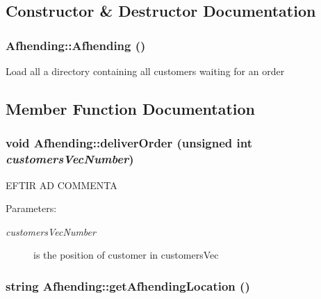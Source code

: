\subsection{Constructor \& Destructor Documentation}
\hypertarget{class_afhending_9365433a6f973ad929ffc0b458bc7c6f}{
\subsubsection[Afhending]{\setlength{\rightskip}{0pt plus 5cm}Afhending::Afhending ()}}
\label{class_afhending_9365433a6f973ad929ffc0b458bc7c6f}


Load all a directory containing all customers waiting for an order 

\subsection{Member Function Documentation}
\hypertarget{class_afhending_1d223b1559fc42935dfef28841735951}{
\subsubsection[deliverOrder]{\setlength{\rightskip}{0pt plus 5cm}void Afhending::deliver\-Order (unsigned int {\em customers\-Vec\-Number})}}
\label{class_afhending_1d223b1559fc42935dfef28841735951}


EFTIR AD  COMMENTA

\begin{Desc}
\item[Parameters:]
\begin{description}
\item[{\em customers\-Vec\-Number}]is the position of customer in customers\-Vec \end{description}
\end{Desc}
\hypertarget{class_afhending_543bc751e47e95a5382a13e161387a1b}{
\subsubsection[getAfhendingLocation]{\setlength{\rightskip}{0pt plus 5cm}string Afhending::get\-Afhending\-Location ()}}
\label{class_afhending_543bc751e47e95a5382a13e161387a1b}


